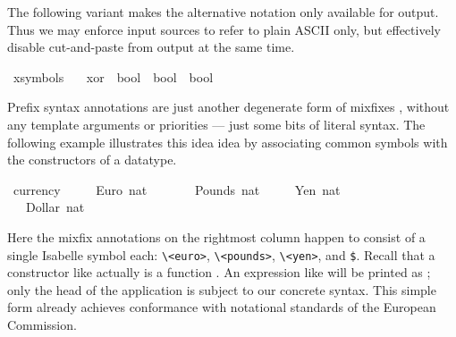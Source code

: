 \begin{isabellebody}
\begin{isamarkuptext}
  \medskip The following variant makes the alternative \isa{{\isasymoplus}}
  notation only available for output.  Thus we may enforce input
  sources to refer to plain ASCII only, but effectively disable
  cut-and-paste from output at the same time.%
\end{isamarkuptext}%
\isamarkuptrue%
\ {\isacharparenleft}xsymbols\ \isanewline
\ \ xor\ {\isacharcolon}{\isacharcolon}\ {\isachardoublequote}bool\ {\isasymRightarrow}\ bool\ {\isasymRightarrow}\ bool{\isachardoublequote}\ \ \ \ {\isacharparenleft}\ {\isachardoublequote}{\isasymoplus}{\isasymignore}{\isachardoublequote}\ {}{}{\isacharparenright}\isamarkupfalse%
%
\isamarkuptrue%
%
\begin{isamarkuptext}%
Prefix syntax annotations are just another
  degenerate form of mixfixes \cite{isabelle-ref}, without any
  template arguments or priorities --- just some bits of literal
  syntax.  The following example illustrates this idea idea by
  associating common symbols with the constructors of a datatype.%
\end{isamarkuptext}%
\isamarkuptrue%
\ currency\ {\isacharequal}\isanewline
\ \ \ \ Euro\ nat\ \ \ \ {\isacharparenleft}{\isachardoublequote}{\isasymeuro}{\isachardoublequote}{\isacharparenright}\isanewline
\ \ {\isacharbar}\ Pounds\ nat\ \ {\isacharparenleft}{\isachardoublequote}{\isasympounds}{\isachardoublequote}{\isacharparenright}\isanewline
\ \ {\isacharbar}\ Yen\ nat\ \ \ \ \ {\isacharparenleft}{\isachardoublequote}{\isasymyen}{\isachardoublequote}{\isacharparenright}\isanewline
\ \ {\isacharbar}\ Dollar\ nat\ \ {\isacharparenleft}{\isachardoublequote}{\isachardollar}{\isachardoublequote}{\isacharparenright}\isamarkupfalse%
%
\begin{isamarkuptext}%
\noindent Here the mixfix annotations on the rightmost column happen
  to consist of a single Isabelle symbol each: \verb,\,\verb,<euro>,,
  \verb,\,\verb,<pounds>,, \verb,\,\verb,<yen>,, and \verb,$,.  Recall
  that a constructor like  actually is a function .  An expression like  will be
  printed as ; only the head of the application is
  subject to our concrete syntax.  This simple form already achieves
  conformance with notational standards of the European Commission.


\end{isamarkuptext}
\end{isabellebody}
